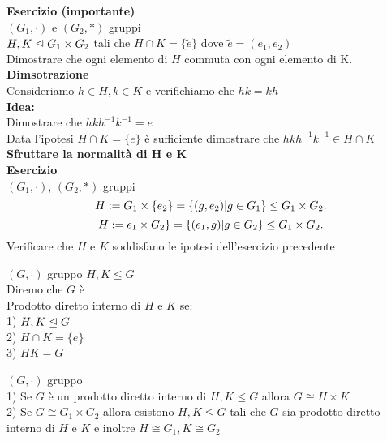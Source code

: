 \documentclass[12px]{article}
\begin{document}
	\textbf{Esercizio (importante)}\\
	$(G_1,\cdot)$ e $(G_2,*)$ gruppi\\
	$H,K\trianglelefteq G_1\times G_2$ tali che $H\cap K = \{\tilde e\}$ dove  $\tilde e  = (e_1,e_2)$\\
	Dimostrare che ogni elemento di $H$ commuta con ogni elemento di K.\\
	\textbf{Dimsotrazione}\\Consideriamo $h\in H, k\in K$ e verifichiamo che  $hk = kh$\\
	 \textbf{Idea:}\\
	 Dimostrare che $hkh^{-1}k^{-1} = e$\\
	 Data l'ipotesi  $H\cap K = \{e\}$ è sufficiente dimostrare che  $hkh^{-1}k^{-1}\in H\cap K$
	  \textbf{Sfruttare la normalità di H e K}\\
	  \textbf{Esercizio}\\
	  $(G_1,\cdot)$, $(G_2,*)$ gruppi
	  \[
		  H:= G_1\times \{e_2\} = \{(g,e_2)|g\in G_1\}\leq G_1\times G_2\\
	  .\] 
	  \[
		  H:= e_1\times G_2\} = \{(e_1,g)|g\in G_2\}\leq G_1\times G_2\\
	  .\] 
	  Verificare che $H$ e $K$ soddisfano le ipotesi dell'esercizio precedente
	  \begin{defi}
	  	$(G,\cdot)$ gruppo $H,K\leq G$\\
		Diremo che  $G$ è \\
		Prodotto diretto interno di $H$ e $K$ se:\\
		1) $H,K\trianglelefteq G$\\
		2)  $H\cap K = \{e\}$\\
		3)  $HK = G$
	  \end{defi}
	  \begin{teo}
	  	$(G,\cdot)$ gruppo\\
		1) Se $G$ è un prodotto diretto interno di $H,K\leq G$ allora  $G\cong H\times K$\\
		2) Se  $G\cong G_1\times G_2$ allora esistono $H,K\leq G$ tali che $G$ sia prodotto diretto interno di $H$ e $K$ e inoltre $H\cong G_1, K\cong G_2$
	  \end{teo}
\end{document}
